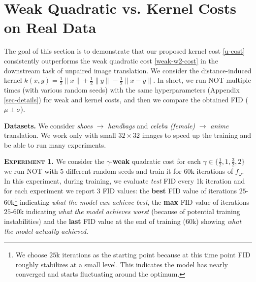 \documentclass{article} %
\newtheorem{lemma}{Lemma}
\begin{document}


\section{Weak Quadratic vs. Kernel Costs on Real Data}
\label{sec-exp-fluctuation}

The goal of this section is to demonstrate that our proposed kernel cost \eqref{u-cost} consistently outperforms the weak quadratic cost \eqref{weak-w2-cost} in the downstream task of unpaired image translation. We consider the distance-induced kernel $k(x,y)=\frac{1}{2}\|x\|+\frac{1}{2}\|y\|-\frac{1}{2}\|x-y\|$. In short, we run NOT \citep[Algorithm 1]{korotin2023neural} multiple times (with various random seeds) with the same hyperparameters (Appendix \ref{sec-details}) for weak and kernel costs, and then we compare the obtained FID ($\mu\pm \sigma$).

\vspace{-1mm}\textbf{Datasets.} We consider \textit{shoes} $\rightarrow$ \textit{handbags}
and \textit{celeba (female)} $\rightarrow$ \textit{anime} translation. We work only with small $32\times 32$ images to speed up the training and be able to run many experiments.

\vspace{-1mm}\textsc{\textbf{Experiment 1.}} We consider the $\gamma$-\textbf{weak} quadratic cost for each $\gamma\in \{\frac{1}{2}, 1,\frac{3}{2},2\}$ we run NOT with 5 different random seeds and train it for $60$k iterations of $f_{\omega}$. In this experiment, during training, we evaluate \textit{test} FID every 1k iteration and for each experiment we report $3$ FID values: the \textbf{best} FID value of iterations $25$-$60$k\footnote{We choose $25$k iterations as the starting point because at this time point FID roughly stabilizes at a small level. This indicates the model has nearly converged and starts fluctuating around the optimum.} indicating \textit{what the model can achieve best}, the \textbf{max} FID value of iterations $25$-$60$k indicating \textit{what the model achieves worst} (because of potential training instabilities) and the \textbf{last} FID value at the end of training ($60$k) showing \textit{what the model actually achieved}.
\end{document}
